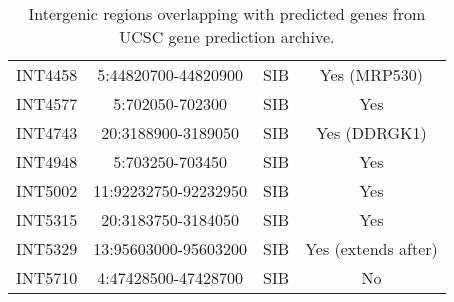 \begin{table}[h]
\begin{tabular}{lccc}
	INT4458 & 5:44820700-44820900 & SIB & Yes (MRP530) \\
	INT4577 & 5:702050-702300 & SIB & Yes \\
	INT4743 & 20:3188900-3189050 & SIB & Yes (DDRGK1) \\
	INT4948 & 5:703250-703450 & SIB & Yes \\
	INT5002 & 11:92232750-92232950 & SIB & Yes \\
	INT5315 & 20:3183750-3184050 & SIB & Yes \\
	INT5329 & 13:95603000-95603200 & SIB & Yes (extends after) \\
	INT5710 & 4:47428500-47428700 & SIB & No \\
        \bottomrule
    \end{tabular}
    \caption{Intergenic regions overlapping with predicted genes from UCSC gene prediction archive.}
    \label{tab:predictionToolsIntergenic}
\end{table}
